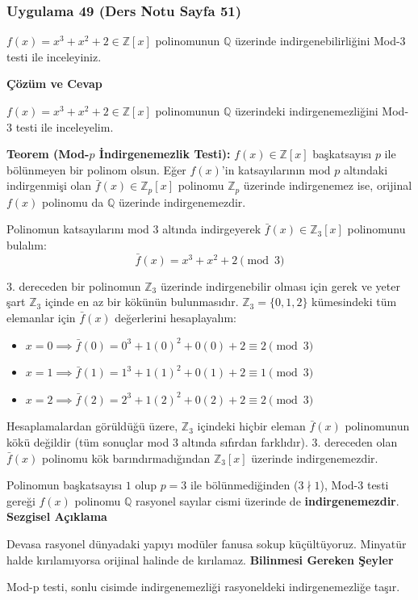 \documentclass[11pt, a4paper]{article}
\newenvironment{cozum}{
    \vspace{0.5cm}
    \noindent\textcolor{green!60!black}{\faCheckCircle\enspace \textbf{\Large Çözüm ve Cevap}}\par\vspace{0.2cm}
}{}
\newenvironment{sezgisel}{
    \vspace{0.5cm}
    \noindent\textcolor{orange!80!black}{\faLightbulb\enspace \textbf{\Large Sezgisel Açıklama}}\par\vspace{0.2cm}
    \itshape
}{}
\newenvironment{bilgi}{
    \vspace{0.5cm}
    \noindent\textcolor{red!70!black}{\faExclamationTriangle\enspace \textbf{\Large Bilinmesi Gereken Şeyler}}\par\vspace{0.2cm}
}{}
\begin{document}
\newpage
\subsubsection{Uygulama 49 (Ders Notu Sayfa 51)}
\begin{sorubox}
$f(x)=x^3+x^2+2 \in \mathbb{Z}[x]$ polinomunun $\mathbb{Q}$ üzerinde indirgenebilirliğini Mod-3 testi ile inceleyiniz.
\end{sorubox}
\begin{cozum}
$f(x) = x^{3} + x^{2} + 2 \in \mathbb{Z}[x]$ polinomunun $\mathbb{Q}$ üzerindeki indirgenemezliğini Mod-3 testi ile inceleyelim.

\textbf{Teorem (Mod-$p$ İndirgenemezlik Testi):} $f(x) \in \mathbb{Z}[x]$ başkatsayısı $p$ ile bölünmeyen bir polinom olsun. Eğer $f(x)$'in katsayılarının mod $p$ altındaki indirgenmişi olan $\bar{f}(x) \in \mathbb{Z}_p[x]$ polinomu $\mathbb{Z}_p$ üzerinde indirgenemez ise, orijinal $f(x)$ polinomu da $\mathbb{Q}$ üzerinde indirgenemezdir.

Polinomun katsayılarını mod 3 altında indirgeyerek $\bar{f}(x) \in \mathbb{Z}_{3}[x]$ polinomunu bulalım:
\[ \bar{f}(x) = x^{3} + x^{2} + 2 \pmod{3} \]

3. dereceden bir polinomun $\mathbb{Z}_{3}$ üzerinde indirgenebilir olması için gerek ve yeter şart $\mathbb{Z}_{3}$ içinde en az bir kökünün bulunmasıdır. $\mathbb{Z}_{3} = \{0, 1, 2\}$ kümesindeki tüm elemanlar için $\bar{f}(x)$ değerlerini hesaplayalım:
\begin{itemize}
    \item $x = 0 \implies \bar{f}(0) = 0^3 + 1(0)^2 + 0(0) + 2 \equiv 2 \pmod{3}$
    \item $x = 1 \implies \bar{f}(1) = 1^3 + 1(1)^2 + 0(1) + 2 \equiv 1 \pmod{3}$
    \item $x = 2 \implies \bar{f}(2) = 2^3 + 1(2)^2 + 0(2) + 2 \equiv 2 \pmod{3}$
\end{itemize}

Hesaplamalardan görüldüğü üzere, $\mathbb{Z}_{3}$ içindeki hiçbir eleman $\bar{f}(x)$ polinomunun kökü değildir (tüm sonuçlar mod 3 altında sıfırdan farklıdır). 3. dereceden olan $\bar{f}(x)$ polinomu kök barındırmadığından $\mathbb{Z}_{3}[x]$ üzerinde indirgenemezdir.

Polinomun başkatsayısı $1$ olup $p = 3$ ile bölünmediğinden ($3 \nmid 1$), Mod-3 testi gereği $f(x)$ polinomu $\mathbb{Q}$ rasyonel sayılar cismi üzerinde de \textbf{indirgenemezdir}.
\end{cozum}
\begin{sezgisel}
Devasa rasyonel dünyadaki yapıyı modüler fanusa sokup küçültüyoruz. Minyatür halde kırılamıyorsa orijinal halinde de kırılamaz.
\end{sezgisel}
\begin{bilgi}
Mod-p testi, sonlu cisimde indirgenemezliği rasyoneldeki indirgenemezliğe taşır.
\end{bilgi}
\end{document}
